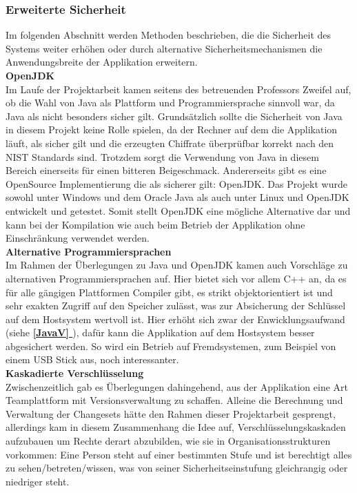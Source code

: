 \documentclass[12pt,a4paper,bibliography=totocnumbered,listof=totocnumbered]{scrartcl}
\newcommand*{\fullref}[1]{\textbf{\hyperref[{#1}]{\ref*{#1} \nameref*{#1}}}}
\begin{document}
\subsubsection{Erweiterte Sicherheit}
Im folgenden Abschnitt werden Methoden beschrieben, die die Sicherheit des Systems weiter erhöhen oder durch alternative Sicherheitsmechanismen die Anwendungsbreite der Applikation erweitern.
\\\textbf{OpenJDK}\\
Im Laufe der Projektarbeit kamen seitens des betreuenden Professors Zweifel auf, ob die Wahl von Java als Plattform und Programmiersprache sinnvoll war, da Java als nicht besonders sicher gilt. Grundsätzlich sollte die Sicherheit von Java in diesem Projekt keine Rolle spielen, da der Rechner auf dem die Applikation läuft, als sicher gilt und die erzeugten Chiffrate überprüfbar korrekt nach den NIST Standards sind. Trotzdem sorgt die Verwendung von Java in diesem Bereich einerseits für einen bitteren Beigeschmack. Andererseits gibt es eine OpenSource Implementierung die als sicherer gilt: OpenJDK. Das Projekt wurde sowohl unter Windows und dem Oracle Java als auch unter Linux und OpenJDK entwickelt und getestet. Somit stellt OpenJDK eine mögliche Alternative dar und kann bei der Kompilation wie auch beim Betrieb der Applikation ohne Einschränkung verwendet werden. 
\\\textbf{Alternative Programmiersprachen}\\
Im Rahmen der Überlegungen zu Java und OpenJDK kamen auch Vorschläge zu alternativen Programmiersprachen auf. Hier bietet sich vor allem C++ an, da es für alle gängigen Plattformen Compiler gibt, es strikt objektorientiert ist und sehr exakten Zugriff auf den Speicher zulässt, was zur Absicherung der Schlüssel auf dem Hostsystem wertvoll ist. Hier erhöht sich zwar der Enwicklungsaufwand (siehe \fullref{JavaV}), dafür kann die Applikation auf dem Hostsystem besser abgesichert werden. So wird ein Betrieb auf Fremdsystemen, zum Beispiel von einem USB Stick aus, noch interessanter.
\\\textbf{Kaskadierte Verschlüsselung}\\
Zwischenzeitlich gab es Überlegungen dahingehend, aus der Applikation eine Art Teamplattform mit Versionsverwaltung zu schaffen. Alleine die Berechnung und Verwaltung der Changesets hätte den Rahmen dieser Projektarbeit gesprengt, allerdings kam in diesem Zusammenhang die Idee auf, Verschlüsselungskaskaden aufzubauen um Rechte derart abzubilden, wie sie in Organisationsstrukturen vorkommen: Eine Person steht auf einer bestimmten Stufe und ist berechtigt alles zu sehen/betreten/wissen, was von seiner Sicherheitseinstufung gleichrangig oder niedriger steht.
\end{document}
